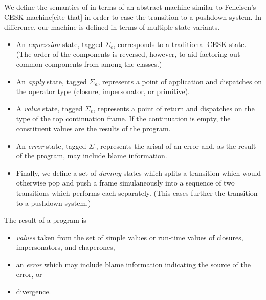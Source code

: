 \documentclass{sigplanconf}
\begin{document}
We define the semantics of \chapcalc in terms of an abstract machine similar to Felleisen's CESK machine[cite that] in order to ease the transition to a pushdown system.
In difference, our machine is defined in terms of multiple state variants.
\begin{itemize}
\item An \emph{expression} state, tagged $\Sigma_{e}$, corresponds to a traditional CESK state.
(The order of the components is reversed, however, to aid factoring out common components from among the classes.)
\item An \emph{apply} state, tagged $\Sigma_{a}$, represents a point of application and dispatches on the operator type (closure, impersonator, or primitive).
\item A \emph{value} state, tagged $\Sigma_{v}$, represents a point of return and dispatches on the type of the top continuation frame.
If the continuation is empty, the constituent values are the results of the program.
\item An \emph{error} state, tagged $\Sigma_!$, represents the arisal of an error and, as the result of the program, may include blame information.
\item Finally, we define a set of \emph{dummy} states which splits a transition which would otherwise pop and push a frame simulaneously into a sequence of two transitions which performs each separately.
(This eases further the transition to a pushdown system.)
\end{itemize}

The result of a program is
\begin{itemize}
\item \emph{values} taken from the set of simple values or run-time values of closures, impersonators, and chaperones,
\item an \emph{error} which may include blame information indicating the source of the error, or
\item divergence.
\end{itemize}



\end{document}
